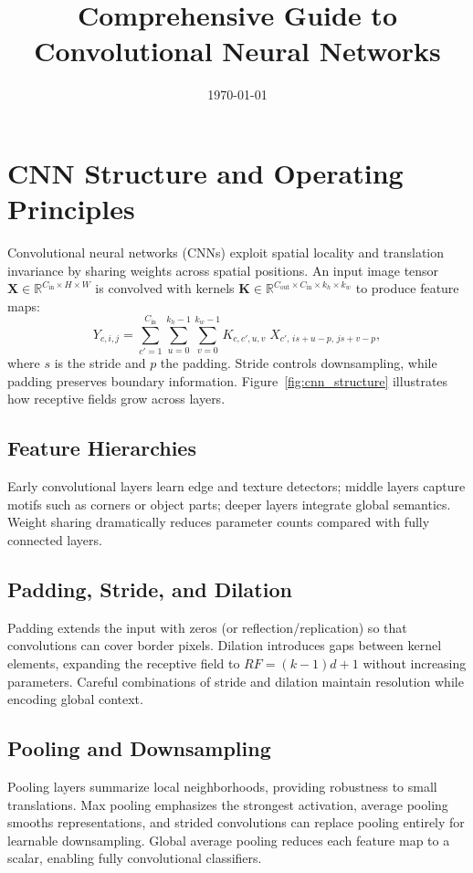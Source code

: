 ﻿\documentclass[12pt]{article}
\title{Comprehensive Guide to Convolutional Neural Networks}
\author{}
\date{\today}
\begin{document}
\maketitle

\section{CNN Structure and Operating Principles}
Convolutional neural networks (CNNs) exploit spatial locality and translation invariance by sharing weights across spatial positions. An input image tensor $\mathbf{X} \in \mathbb{R}^{C_{\mathrm{in}} \times H \times W}$ is convolved with kernels $\mathbf{K} \in \mathbb{R}^{C_{\mathrm{out}} \times C_{\mathrm{in}} \times k_h \times k_w}$ to produce feature maps:
\begin{equation}
  Y_{c,i,j} = \sum_{c'=1}^{C_{\mathrm{in}}} \sum_{u=0}^{k_h-1} \sum_{v=0}^{k_w-1} K_{c,c',u,v} \; X_{c',\, i s + u - p,\, j s + v - p},
\end{equation}
where $s$ is the stride and $p$ the padding. Stride controls downsampling, while padding preserves boundary information. Figure~\ref{fig:cnn_structure} illustrates how receptive fields grow across layers.

\subsection{Feature Hierarchies}
Early convolutional layers learn edge and texture detectors; middle layers capture motifs such as corners or object parts; deeper layers integrate global semantics. Weight sharing dramatically reduces parameter counts compared with fully connected layers.

\subsection{Padding, Stride, and Dilation}
Padding extends the input with zeros (or reflection/replication) so that convolutions can cover border pixels. Dilation introduces gaps between kernel elements, expanding the receptive field to $\mathit{RF} = (k - 1) d + 1$ without increasing parameters. Careful combinations of stride and dilation maintain resolution while encoding global context.

\subsection{Pooling and Downsampling}
Pooling layers summarize local neighborhoods, providing robustness to small translations. Max pooling emphasizes the strongest activation, average pooling smooths representations, and strided convolutions can replace pooling entirely for learnable downsampling. Global average pooling reduces each feature map to a scalar, enabling fully convolutional classifiers.
\end{document}
